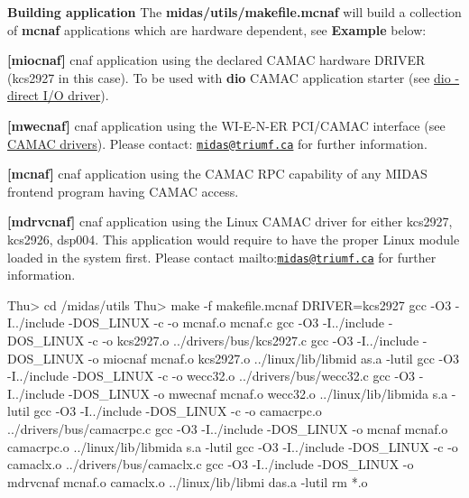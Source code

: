 \begin{DoxyItemize}
\item {\bfseries  Building application } The {\bfseries midas/utils/makefile.mcnaf} will build a collection of {\bfseries mcnaf} applications which are hardware dependent, see {\bfseries  Example } below:
\begin{DoxyItemize}
\item {\bfseries \mbox{[}miocnaf\mbox{]}} cnaf application using the declared CAMAC hardware DRIVER (kcs2927 in this case). To be used with {\bfseries dio} CAMAC application starter (see \hyperlink{FE_utils_FE_dio_utility}{dio -\/ direct I/O driver}).
\item {\bfseries \mbox{[}mwecnaf\mbox{]}} cnaf application using the WI-\/E-\/N-\/ER PCI/CAMAC interface (see \hyperlink{FE_Hardware_CAMAC_drivers}{CAMAC drivers}). Please contact: \href{mailto:midas@triumf.ca}{\tt midas@triumf.ca} for further information.
\item {\bfseries \mbox{[}mcnaf\mbox{]}} cnaf application using the CAMAC RPC capability of any MIDAS frontend program having CAMAC access.
\item {\bfseries \mbox{[}mdrvcnaf\mbox{]}} cnaf application using the Linux CAMAC driver for either kcs2927, kcs2926, dsp004. This application would require to have the proper Linux module loaded in the system first. Please contact mailto:\href{mailto:midas@triumf.ca}{\tt midas@triumf.ca} for further information.
\end{DoxyItemize}
\end{DoxyItemize}


\begin{DoxyCode}
Thu> cd /midas/utils
Thu> make -f makefile.mcnaf DRIVER=kcs2927
gcc -O3 -I../include -DOS_LINUX -c -o mcnaf.o mcnaf.c
gcc -O3 -I../include -DOS_LINUX -c -o kcs2927.o ../drivers/bus/kcs2927.c
gcc -O3 -I../include -DOS_LINUX -o miocnaf mcnaf.o kcs2927.o  ../linux/lib/libmid
      as.a -lutil
gcc -O3 -I../include -DOS_LINUX -c -o wecc32.o ../drivers/bus/wecc32.c
gcc -O3 -I../include -DOS_LINUX -o mwecnaf mcnaf.o wecc32.o  ../linux/lib/libmida
      s.a -lutil 
gcc -O3 -I../include -DOS_LINUX -c -o camacrpc.o ../drivers/bus/camacrpc.c
gcc -O3 -I../include -DOS_LINUX -o mcnaf mcnaf.o camacrpc.o  ../linux/lib/libmida
      s.a -lutil 
gcc -O3 -I../include -DOS_LINUX -c -o camaclx.o ../drivers/bus/camaclx.c
gcc -O3 -I../include -DOS_LINUX -o mdrvcnaf mcnaf.o camaclx.o  ../linux/lib/libmi
      das.a -lutil 
rm *.o
\end{DoxyCode}



